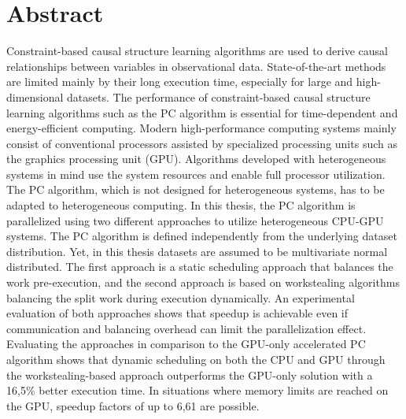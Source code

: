 \chapter*{Abstract}
Constraint-based causal structure learning algorithms are used to derive causal relationships between variables in observational data. State-of-the-art methods are limited mainly by their long execution time, especially for large and high-dimensional datasets. The performance of constraint-based causal structure learning algorithms such as the PC algorithm is essential for time-dependent and energy-efficient computing. Modern high-performance computing systems mainly consist of conventional processors assisted by specialized processing units such as the graphics processing unit (GPU). Algorithms developed with heterogeneous systems in mind use the system resources and enable full processor utilization. The PC algorithm, which is not designed for heterogeneous systems, has to be adapted to heterogeneous computing. In this thesis, the PC algorithm is parallelized using two different approaches to utilize heterogeneous CPU-GPU systems. The PC algorithm is defined independently from the underlying dataset distribution. Yet, in this thesis datasets are assumed to be multivariate normal distributed. The first approach is a static scheduling approach that balances the work pre-execution, and the second approach is based on workstealing algorithms balancing the split work during execution dynamically. An experimental evaluation of both approaches shows that speedup is achievable even if communication and balancing overhead can limit the parallelization effect. Evaluating the approaches in comparison to the GPU-only accelerated PC algorithm shows that dynamic scheduling on both the CPU and GPU through the workstealing-based approach outperforms the GPU-only solution with a 16,5\% better execution time. In situations where memory limits are reached on the GPU, speedup factors of up to 6,61 are possible.
